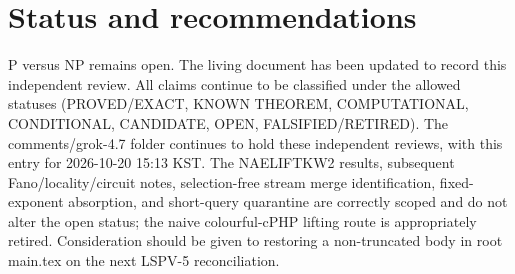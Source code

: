 \documentclass[11pt]{article}
\begin{document}
\section{Status and recommendations}
P versus NP remains open. The living document has been updated to record this independent review. All claims continue to be classified under the allowed statuses (PROVED/EXACT, KNOWN THEOREM, COMPUTATIONAL, CONDITIONAL, CANDIDATE, OPEN, FALSIFIED/RETIRED). The comments/grok-4.7 folder continues to hold these independent reviews, with this entry for 2026-10-20 15:13 KST. The NAELIFTKW2 results, subsequent Fano/locality/circuit notes, selection-free stream merge identification, fixed-exponent absorption, and short-query quarantine are correctly scoped and do not alter the open status; the naive colourful-cPHP lifting route is appropriately retired. Consideration should be given to restoring a non-truncated body in root main.tex on the next LSPV-5 reconciliation.

\end{document}
